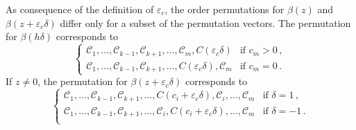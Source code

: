 \begin{remark}
  As consequence of the definition of \(\varepsilon_c\), the order permutations
  for \(\beta(z)\) and \(\beta(z + {\varepsilon_c} \delta)\) differ only for a
  subset of the permutation vectors.
  The permutation for \(\beta(h\delta)\)
  corresponds to
  \begin{equation*}
    \begin{cases}
      \mathcal{C}_1, \dots, \mathcal{C}_{k-1}, \mathcal{C}_{k+1}, \dots, \mathcal{C}_m, C({\varepsilon_c}\delta)
       & \text{if } c_m > 0 \, , \\ %
      \mathcal{C}_1, \dots, \mathcal{C}_{k-1}, \mathcal{C}_{k+1}, \dots, C({\varepsilon_c}\delta), \mathcal{C}_m
       & \text{if } c_m = 0 \, . %
    \end{cases}
  \end{equation*}
  If \(z \neq 0\), the permutation for \(\beta(z + {\varepsilon_c} \delta)\) corresponds to
  \[
    \begin{cases}
      \mathcal{C}_1, \dots, \mathcal{C}_{k-1}, \mathcal{C}_{k+1}, \dots, C(c_i + {\varepsilon_c}\delta), \mathcal{C}_i, \dots, \mathcal{C}_m
       & \text{if } \delta = 1 \,,   \\
      \mathcal{C}_1, \dots, \mathcal{C}_{k-1}, \mathcal{C}_{k+1}, \dots, \mathcal{C}_i, C(c_i + {\varepsilon_c}\delta), \dots, \mathcal{C}_m
       & \text{if } \delta = -1 \, . \\
    \end{cases}
  \]
\end{remark}

